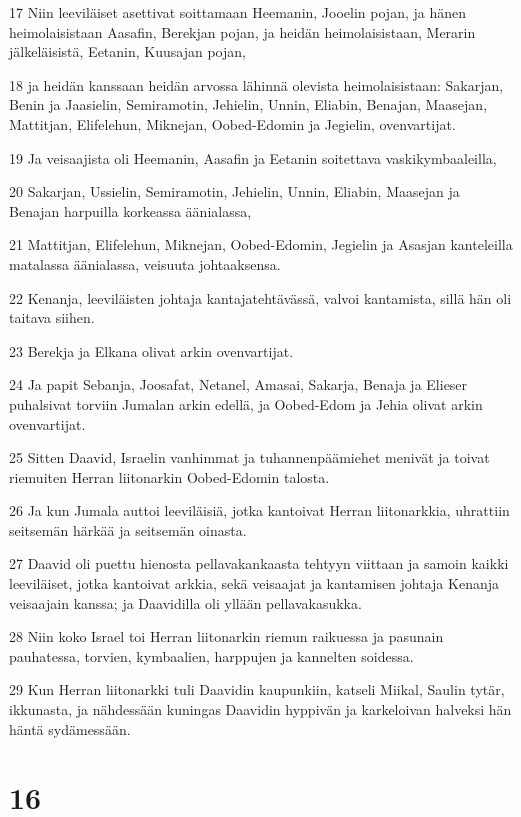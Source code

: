\par 17 Niin leeviläiset asettivat soittamaan Heemanin, Jooelin pojan, ja hänen heimolaisistaan Aasafin, Berekjan pojan, ja heidän heimolaisistaan, Merarin jälkeläisistä, Eetanin, Kuusajan pojan,
\par 18 ja heidän kanssaan heidän arvossa lähinnä olevista heimolaisistaan: Sakarjan, Benin ja Jaasielin, Semiramotin, Jehielin, Unnin, Eliabin, Benajan, Maasejan, Mattitjan, Elifelehun, Miknejan, Oobed-Edomin ja Jegielin, ovenvartijat.
\par 19 Ja veisaajista oli Heemanin, Aasafin ja Eetanin soitettava vaskikymbaaleilla,
\par 20 Sakarjan, Ussielin, Semiramotin, Jehielin, Unnin, Eliabin, Maasejan ja Benajan harpuilla korkeassa äänialassa,
\par 21 Mattitjan, Elifelehun, Miknejan, Oobed-Edomin, Jegielin ja Asasjan kanteleilla matalassa äänialassa, veisuuta johtaaksensa.
\par 22 Kenanja, leeviläisten johtaja kantajatehtävässä, valvoi kantamista, sillä hän oli taitava siihen.
\par 23 Berekja ja Elkana olivat arkin ovenvartijat.
\par 24 Ja papit Sebanja, Joosafat, Netanel, Amasai, Sakarja, Benaja ja Elieser puhalsivat torviin Jumalan arkin edellä, ja Oobed-Edom ja Jehia olivat arkin ovenvartijat.
\par 25 Sitten Daavid, Israelin vanhimmat ja tuhannenpäämiehet menivät ja toivat riemuiten Herran liitonarkin Oobed-Edomin talosta.
\par 26 Ja kun Jumala auttoi leeviläisiä, jotka kantoivat Herran liitonarkkia, uhrattiin seitsemän härkää ja seitsemän oinasta.
\par 27 Daavid oli puettu hienosta pellavakankaasta tehtyyn viittaan ja samoin kaikki leeviläiset, jotka kantoivat arkkia, sekä veisaajat ja kantamisen johtaja Kenanja veisaajain kanssa; ja Daavidilla oli yllään pellavakasukka.
\par 28 Niin koko Israel toi Herran liitonarkin riemun raikuessa ja pasunain pauhatessa, torvien, kymbaalien, harppujen ja kannelten soidessa.
\par 29 Kun Herran liitonarkki tuli Daavidin kaupunkiin, katseli Miikal, Saulin tytär, ikkunasta, ja nähdessään kuningas Daavidin hyppivän ja karkeloivan halveksi hän häntä sydämessään.

\chapter{16}

